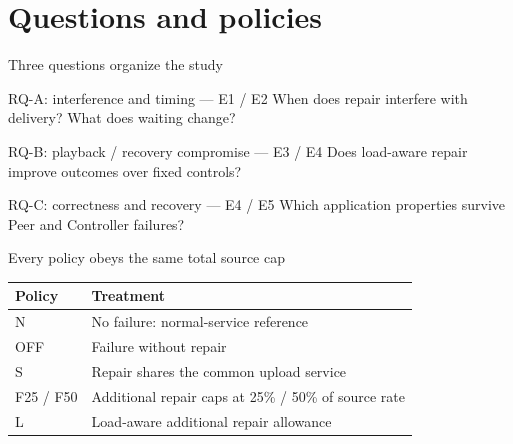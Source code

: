 \section{Questions and policies}
\begin{frame}{Three questions organize the study}
\begin{block}{RQ-A: interference and timing --- E1 / E2}
When does repair interfere with delivery? What does waiting change?
\end{block}
\begin{block}{RQ-B: playback / recovery compromise --- E3 / E4}
Does load-aware repair improve outcomes over fixed controls?
\end{block}
\begin{block}{RQ-C: correctness and recovery --- E4 / E5}
Which application properties survive Peer and Controller failures?
\end{block}
\end{frame}
\begin{frame}{Every policy obeys the same total source cap}
\begin{tabularx}{\textwidth}{lY}
\toprule Policy & Treatment \\\midrule
N & No failure: normal-service reference\\
OFF & Failure without repair\\
S & Repair shares the common upload service\\
F25 / F50 & Additional repair caps at 25\% / 50\% of source rate\\
L & Load-aware additional repair allowance\\\bottomrule
\end{tabularx}
\end{frame}
